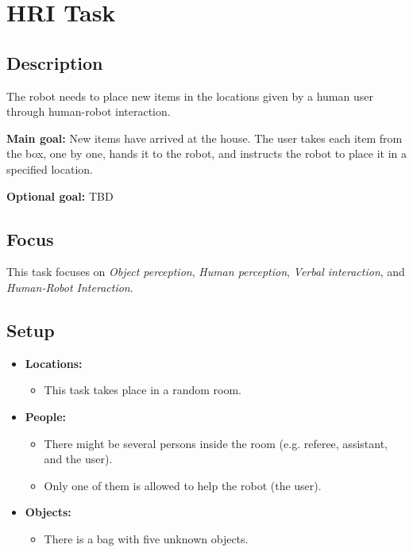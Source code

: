 \section{HRI Task}
\label{test:hri-task}

\subsection*{Description}
The robot needs to place new items in the locations given by a human user through human-robot interaction.

\textbf{Main goal:}
New items have arrived at the house. The user takes each item from the box, one by one, hands it to the robot, and instructs the robot to place it in a specified location.

\textbf{Optional goal:}
TBD


\subsection*{Focus}
This task focuses on
\textit{Object perception},
\textit{Human perception},
\textit{Verbal interaction}, and
\textit{Human-Robot Interaction}.

\subsection*{Setup}
\begin{itemize}[nosep]	
	\item \textbf{Locations:} 
	\begin{itemize}
		\item This task takes place in a random room.
	\end{itemize}	 
	\item \textbf{People:} 
	\begin{itemize}
		\item There might be several persons inside the room (e.g. referee, assistant, and the user).
		\item Only one of them is allowed to help the robot (the user).
	\end{itemize}
	\item \textbf{Objects:}
		\begin{itemize}
			\item There is a bag with five unknown objects.
		\end{itemize}
\end{itemize}

